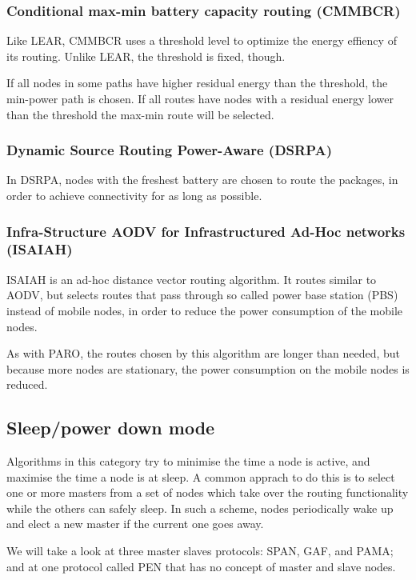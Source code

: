 \documentclass[conference]{IEEEtran}
\begin{document}
\subsubsection{Conditional max-min battery capacity routing (CMMBCR)}
Like LEAR, CMMBCR\cite{toh2001maximum} uses a threshold level to optimize
the energy effiency of its routing.
Unlike LEAR, the threshold is fixed, though.

If all nodes in some paths have higher residual energy than the threshold,
the min-power path is chosen.
If all routes have nodes with a residual energy lower than the threshold the
max-min route will be selected.

\subsubsection{Dynamic Source Routing Power-Aware (DSRPA)}
In DSRPA\cite{djenouri2006dynamic}, nodes with the freshest battery are
chosen to route the packages, in order to achieve connectivity for as
long as possible.\cite{alotaibi2012survey}

\subsubsection{Infra-Structure AODV for Infrastructured Ad-Hoc networks (ISAIAH)}
ISAIAH\cite{lindgren2002infrastructured} is an ad-hoc distance vector routing
algorithm. It routes similar to AODV, but selects routes that pass through
so called power base station (PBS) instead of mobile nodes, in order to reduce
the power consumption of the mobile nodes.

As with PARO, the routes chosen by this algorithm are longer than needed, but
because more nodes are stationary, the power consumption on the mobile nodes
is reduced.

\subsection{Sleep/power­ down mode}
Algorithms in this category try to minimise the time a node is active, and
maximise the time a node is at sleep. A common apprach to do this is to select
one or more masters from a set of nodes which take over the routing functionality
while the others can safely sleep. In such a scheme, nodes periodically wake up
and elect a new master if the current one goes away.

We will take a look at three master slaves protocols: SPAN, GAF, and PAMA;
and at one protocol called PEN that has no concept of master and slave nodes.
\end{document}
